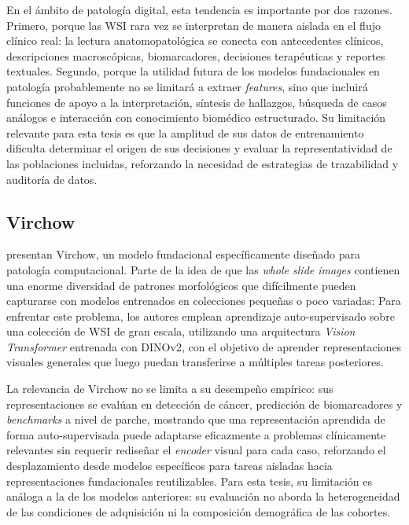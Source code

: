 En el ámbito de patología digital, esta tendencia es importante por dos razones. Primero, porque las WSI rara vez se interpretan de manera aislada en el flujo clínico real: la lectura anatomopatológica se conecta con antecedentes clínicos, descripciones macroscópicas, biomarcadores, decisiones terapéuticas y reportes textuales. Segundo, porque la utilidad futura de los modelos fundacionales en patología probablemente no se limitará a extraer \textit{features}, sino que incluirá funciones de apoyo a la interpretación, síntesis de hallazgos, búsqueda de casos análogos e interacción con conocimiento biomédico estructurado. Su limitación relevante para esta tesis es que la amplitud de sus datos de entrenamiento dificulta determinar el origen de sus decisiones y evaluar la representatividad de las poblaciones incluidas, reforzando la necesidad de estrategias de trazabilidad y auditoría de datos.

\subsection{Virchow}

\textcite{vorontsov2024virchow} presentan Virchow, un modelo fundacional específicamente diseñado para patología computacional. Parte de la idea de que las \textit{whole slide images} contienen una enorme diversidad de patrones morfológicos que difícilmente pueden capturarse con modelos entrenados en colecciones pequeñas o poco variadas: Para enfrentar este problema, los autores emplean aprendizaje auto-supervisado sobre una colección de WSI de gran escala, utilizando una arquitectura \textit{Vision Transformer} entrenada con DINOv2, con el objetivo de aprender representaciones visuales generales que luego puedan transferirse a múltiples tareas posteriores.

La relevancia de Virchow no se limita a su desempeño empírico: sus representaciones se evalúan en detección de cáncer, predicción de biomarcadores y \textit{benchmarks} a nivel de parche, mostrando que una representación aprendida de forma auto-supervisada puede adaptarse eficazmente a problemas clínicamente relevantes sin requerir rediseñar el \textit{encoder} visual para cada caso, reforzando el desplazamiento desde modelos específicos para tareas aisladas hacia representaciones fundacionales reutilizables. Para esta tesis, su limitación es análoga a la de los modelos anteriores: su evaluación no aborda la heterogeneidad de las condiciones de adquisición ni la composición demográfica de las cohortes.


